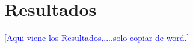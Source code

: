 \chapter{Resultados}\label{cap5:resultados}

\textcolor{blue}{[Aqui viene los Resultados.....solo copiar de word.]}
\bigskip